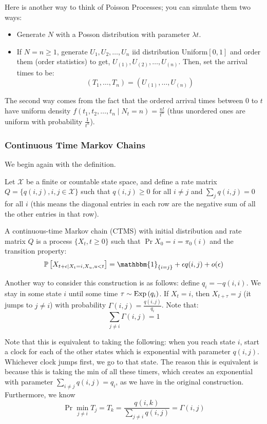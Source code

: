Here is another way to think of Poisson Processes; you can simulate them two ways:
\begin{itemize}
    \item Generate $N$ with a Posson distribution with parameter $\lambda t$.
    \item If $N = n \geq 1$, generate $U_1, U_2, \dots, U_n$ iid distribution Uniform$[0, 1]$ and
    order them (order statistics) to get, $U_{(1)}, U_{(2)}, \dots, U_{(n)}$. Then,
    set the arrival times to be:
    \[ (T_1, \dots, T_n) = (U_{(1)}, \dots, U_{(n)}) \]
\end{itemize}

The second way comes from the fact that the ordered arrival times between $0$ to $t$
have uniform density $f(t_1, t_2, \dots, t_n \mid N_{t} = n) = \frac{n!}{t^n}$ (thus unordered ones are uniform with probability $\frac{1}{t^n}$).

\subsubsection{Continuous Time Markov Chains}
We begin again with the definition.
\begin{definition}
    Let $\mathcal{X}$ be a finite or countable state space, and define a rate matrix $Q = \{q(i, j), i, j \in \mathcal{X}\}$
    such that $q(i, j) \geq 0$ for all $i \neq j$ and $\sum_{j} q(i, j) = 0$ for all $i$ (this means the
    diagonal entries in each row are the negative sum of all the other entries in that row).

    A continuous-time Markov chain (CTMS) with initial distribution and rate matrix $Q$ is a process
    $\{X_t, t \geq 0\}$ such that $\Pr{X_0 = i} = \pi_0(i)$ and the transition property:
    \[ \Pr{X_{t + \epsilon \mid X_t = i, X_u, u < t}} = \mathbbm{1}_{\{i = j\}} + \epsilon q(i, j) + o(\epsilon) \]

    Another way to consider this construction is as follows:
    define $q_i = -q(i, i)$. We stay in some state $i$ until some time $\tau \sim \text{Exp}\left( q_i \right)$. If $X_t = i$,
    then $X_{t + \tau} = j$ (it jumps to $j \neq i$) with probability $\Gamma(i, j) = \frac{q(i,j)}{q_i}$.
    Note that:
    \[ \sum_{j \neq i} \Gamma(i, j) = 1 \]
\end{definition}

Note that this is equivalent to taking the following: when you reach state $i$, start a clock for each of the other states
which is exponential with parameter $q(i, j)$. Whichever clock jumps first, we go to that state. The reason this is equivalent is because
this is taking the min of all these timers, which creates an exponential with parameter $\sum_{i \neq j} q(i, j) = q_i$, as we
have in the original construction. Furthermore, we know
\[ \Pr{\min_{j \neq i} T_j = T_k} = \frac{q(i, k)}{\sum_{j \neq i} q(i, j)} = \Gamma(i, j) \]
